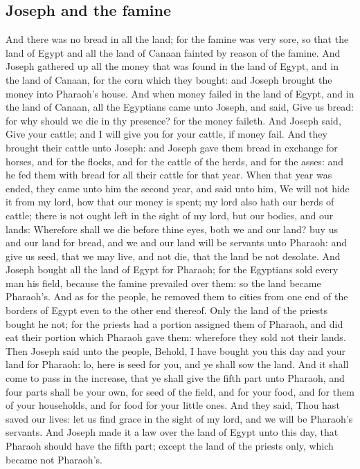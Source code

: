 \begin{biblechapter}
\section*{Joseph and the famine}
\verse And there was no bread in all the land; for the famine was very sore, so that the land of Egypt and all the land of Canaan fainted by reason of the famine.
\verse And Joseph gathered up all the money that was found in the land of Egypt, and in the land of Canaan, for the corn which they bought: and Joseph brought the money into Pharaoh's house.
\verse And when money failed in the land of Egypt, and in the land of Canaan, all the Egyptians came unto Joseph, and said, Give us bread: for why should we die in thy presence? for the money faileth.
\verse And Joseph said, Give your cattle; and I will give you for your cattle, if money fail.
\verse And they brought their cattle unto Joseph: and Joseph gave them bread in exchange for horses, and for the flocks, and for the cattle of the herds, and for the asses: and he fed them with bread for all their cattle for that year.
\verse When that year was ended, they came unto him the second year, and said unto him, We will not hide it from my lord, how that our money is spent; my lord also hath our herds of cattle; there is not ought left in the sight of my lord, but our bodies, and our lands:
\verse Wherefore shall we die before thine eyes, both we and our land? buy us and our land for bread, and we and our land will be servants unto Pharaoh: and give us seed, that we may live, and not die, that the land be not desolate.
\verse And Joseph bought all the land of Egypt for Pharaoh; for the Egyptians sold every man his field, because the famine prevailed over them: so the land became Pharaoh's.
\verse And as for the people, he removed them to cities from one end of the borders of Egypt even to the other end thereof.
\verse Only the land of the priests bought he not; for the priests had a portion assigned them of Pharaoh, and did eat their portion which Pharaoh gave them: wherefore they sold not their lands.
\verse Then Joseph said unto the people, Behold, I have bought you this day and your land for Pharaoh: lo, here is seed for you, and ye shall sow the land.
\verse And it shall come to pass in the increase, that ye shall give the fifth part unto Pharaoh, and four parts shall be your own, for seed of the field, and for your food, and for them of your households, and for food for your little ones.
\verse And they said, Thou hast saved our lives: let us find grace in the sight of my lord, and we will be Pharaoh's servants.
\verse And Joseph made it a law over the land of Egypt unto this day, that Pharaoh should have the fifth part; except the land of the priests only, which became not Pharaoh's.

\end{biblechapter}
